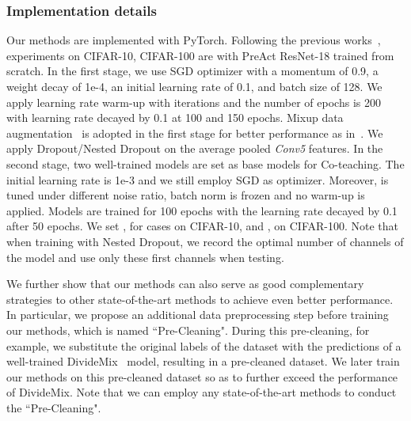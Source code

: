 \documentclass[journal]{IEEEtran}
\begin{document}
\subsubsection{Implementation details}
Our methods are implemented with PyTorch.
Following the previous works~\cite{li2020dividemix,arazo2019unsupervised}, experiments on CIFAR-10, CIFAR-100 are with PreAct ResNet-18 \cite{he2016identity} trained from scratch.
In the first stage, we use SGD optimizer with a momentum of 0.9, a weight decay of 1e-4, an initial learning rate of 0.1, and batch size of 128.
We apply learning rate warm-up with  iterations and the number of epochs is 200 with learning rate decayed by 0.1 at 100 and 150 epochs.
Mixup data augmentation~\cite{zhang2018mixup} is adopted in the first stage for better performance as in~\cite{li2020dividemix,arazo2019unsupervised}.
We apply Dropout/Nested Dropout on the average pooled \textit{Conv5} features.
In the second stage, two well-trained models are set as base models for Co-teaching. 
The initial learning rate is 1e-3 and we still employ SGD as optimizer.
Moreover,  is tuned under different noise ratio, batch norm is frozen and no warm-up is applied.
Models are trained for 100 epochs with the learning rate decayed by 0.1 after 50 epochs.
We set ,  for cases on CIFAR-10, and ,  on CIFAR-100.
Note that when training with Nested Dropout, we record the optimal number of channels  of the model and use only these first  channels when testing.

We further show that our methods can also serve as good complementary strategies to other state-of-the-art methods to achieve even better performance.
In particular, we propose an additional data preprocessing step before training our methods, which is named ``Pre-Cleaning".
During this pre-cleaning, for example, we substitute the original labels of the dataset with the predictions of a well-trained DivideMix~\cite{li2020dividemix} model, resulting in a pre-cleaned dataset.
We later train our methods on this pre-cleaned dataset so as to further exceed the performance of DivideMix.
Note that we can employ any state-of-the-art methods to conduct the ``Pre-Cleaning".
\end{document}

